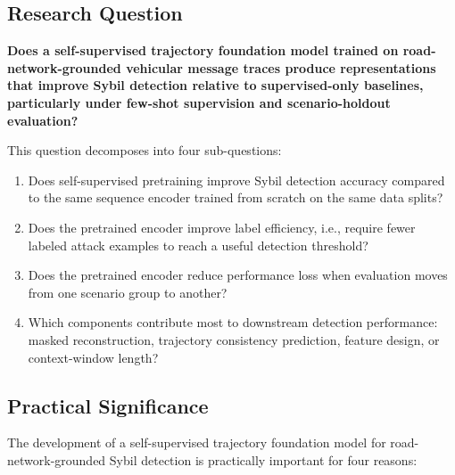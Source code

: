 \documentclass[12pt]{article}
\begin{document}
\subsection{Research Question}

\textbf{Does a self-supervised trajectory foundation model trained on road-network-grounded vehicular message traces produce representations that improve Sybil detection relative to supervised-only baselines, particularly under few-shot supervision and scenario-holdout evaluation?}

This question decomposes into four sub-questions:

\begin{enumerate}
    \item Does self-supervised pretraining improve Sybil detection accuracy compared to the same sequence encoder trained from scratch on the same data splits?

    \item Does the pretrained encoder improve label efficiency, i.e., require fewer labeled attack examples to reach a useful detection threshold?

    \item Does the pretrained encoder reduce performance loss when evaluation moves from one scenario group to another?

    \item Which components contribute most to downstream detection performance: masked reconstruction, trajectory consistency prediction, feature design, or context-window length?
\end{enumerate}

\subsection{Practical Significance}

The development of a self-supervised trajectory foundation model for road-network-grounded Sybil detection is practically important for four reasons:
\end{document}
